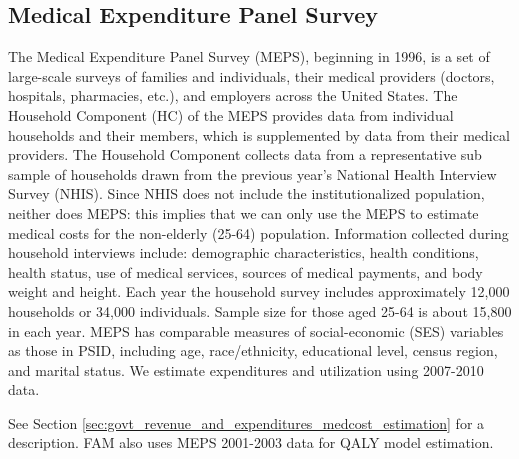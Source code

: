 \subsection{Medical Expenditure Panel Survey}
\label{sec:data_sources_estimation_meps}
The Medical Expenditure Panel Survey (MEPS), beginning in 1996, is a set of large-scale surveys of 
families and individuals, their medical providers (doctors, hospitals, pharmacies, etc.), and 
employers across the United States. The Household Component (HC) of the MEPS provides data from 
individual households and their members, which is supplemented by data from their medical providers. 
The Household Component collects data from a representative sub sample of households drawn from the 
previous year's National Health Interview Survey (NHIS). Since NHIS does not include the 
institutionalized population, neither does MEPS: this implies that we can only use the MEPS to 
estimate medical costs for the non-elderly (25-64) population. Information collected during household 
interviews include: demographic characteristics, health conditions, health status, use of medical 
services, sources of medical payments, and body weight and height. Each year the household survey 
includes approximately 12,000 households or 34,000 individuals. Sample size for those aged 25-64 is 
about 15,800 in each year.  MEPS has comparable measures of social-economic (SES) variables as those in PSID, 
including age, race/ethnicity, educational level, census region, and marital status.  We estimate expenditures 
and utilization using 2007-2010 data.

See Section 
\ref{sec:govt_revenue_and_expenditures_medcost_estimation} for a description.  FAM also
uses MEPS 2001-2003 data for QALY model estimation. 


